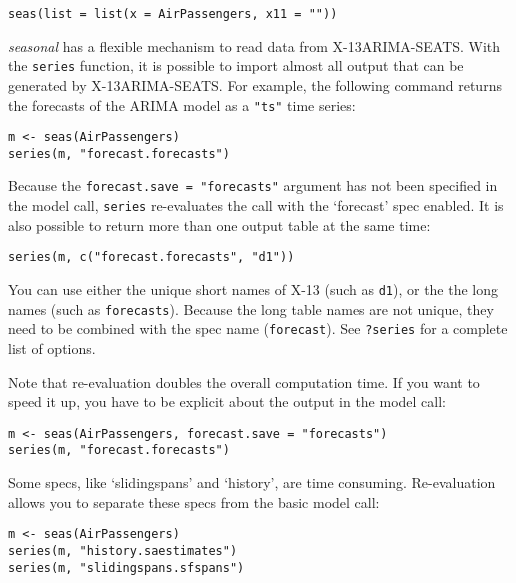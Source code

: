 \begin{verbatim}
seas(list = list(x = AirPassengers, x11 = ""))
\end{verbatim}


\emph{seasonal} has a flexible mechanism to read data from
X-13ARIMA-SEATS. With the \texttt{series} function, it is possible to
import almost all output that can be generated by X-13ARIMA-SEATS. For
example, the following command returns the forecasts of the ARIMA model
as a \texttt{"ts"} time series:

\begin{verbatim}
m <- seas(AirPassengers)
series(m, "forecast.forecasts")
\end{verbatim}

Because the \texttt{forecast.save = "forecasts"} argument has not been
specified in the model call, \texttt{series} re-evaluates the call with
the `forecast' spec enabled. It is also possible to return more than one
output table at the same time:

\begin{verbatim}
series(m, c("forecast.forecasts", "d1"))
\end{verbatim}

You can use either the unique short names of X-13 (such as \texttt{d1}),
or the the long names (such as \texttt{forecasts}). Because the long
table names are not unique, they need to be combined with the spec name
(\texttt{forecast}). See \texttt{?series} for a complete list of
options.

Note that re-evaluation doubles the overall computation time. If you
want to speed it up, you have to be explicit about the output in the
model call:

\begin{verbatim}
m <- seas(AirPassengers, forecast.save = "forecasts")
series(m, "forecast.forecasts")
\end{verbatim}

Some specs, like `slidingspans' and `history', are time consuming.
Re-evaluation allows you to separate these specs from the basic model
call:

\begin{verbatim}
m <- seas(AirPassengers)
series(m, "history.saestimates")
series(m, "slidingspans.sfspans")
\end{verbatim}

